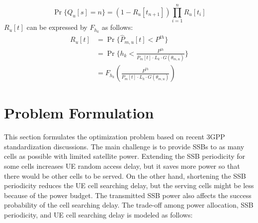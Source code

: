 \begin{equation}
    \Pr\{Q_u[s] = n\} = (1 - R_u[t_{n+1}]) \prod_{i=1}^n R_u[t_i]
\end{equation}
$R_u[t]$ can be expressed by $F_{h_k}$ as follows:
\begin{equation}
    \begin{aligned}
        R_u[t]
        &= \Pr\{\hat{P}_{m, u}[t] < P^{th}\} \\
        &= \Pr\{h_k < \frac{P^{th}}{P_m[t] \cdot L_k \cdot G(\theta_{m, u})}\} \\
        &= F_{h_k}(\frac{P^{th}}{P_m[t] \cdot L_k \cdot G(\theta_{m, u})})
    \end{aligned} \label{eq:Ru}
\end{equation}


\section{Problem Formulation}
This section formulates the optimization problem based on recent 3GPP standardization discussions. The main challenge is to provide SSBs to as many cells as possible with limited satellite power. Extending the SSB periodicity for some cells increases UE random access delay, but it saves more power so that there would be other cells to be served. On the other hand, shortening the SSB periodicity reduces the UE cell searching delay, but the serving cells might be less because of the power budget. The transmitted SSB power also affects the success probability of the cell searching delay. The trade-off among power allocation, SSB periodicity, and UE cell searching delay is modeled as follows:


